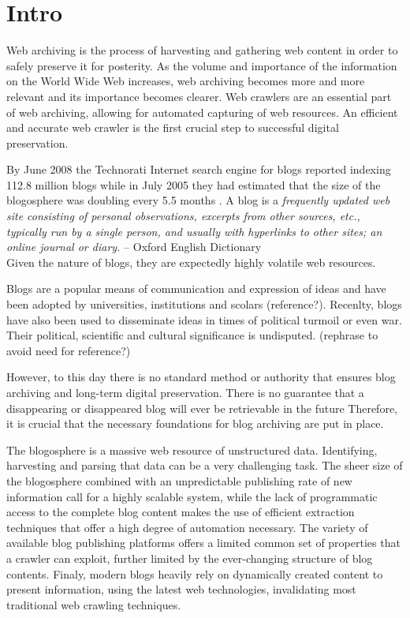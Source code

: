\section{Intro}

Web archiving is the process of harvesting and gathering web content in order to safely preserve it for posterity.
As the volume and importance of the information on the World Wide Web increases, web archiving becomes more and more relevant and its importance becomes clearer.
Web crawlers are an essential part of web archiving, allowing for automated capturing of web resources.
An efficient and accurate web crawler is the first crucial step to successful digital preservation.

By June 2008 the Technorati Internet search engine for blogs reported indexing 112.8 million blogs \cite{technoratidata2008} while in July 2005 they had estimated that the size of the blogosphere was doubling every 5.5 months \cite{bloggrowth2005}.
A blog is a \emph{frequently updated web site consisting of personal observations, excerpts from other sources, etc., typically run by a single person, and usually with hyperlinks to other sites; an online journal or diary.} -- Oxford English Dictionary\\
Given the nature of blogs, they are expectedly highly volatile web resources.

Blogs are a popular means of communication and expression of ideas and have been adopted by universities, institutions and scolars (reference?).
Recenlty, blogs have also been used to disseminate ideas in times of political turmoil or even war\cite{nahedeltantawy2012}.
Their political, scientific and cultural significance is undisputed. (rephrase to avoid need for reference?)

However, to this day there is no standard method or authority that ensures blog archiving and long-term digital preservation.
There is no guarantee that a disappearing or disappeared blog will ever be retrievable in the future \cite{anderson2012}
Therefore, it is crucial that the necessary foundations for blog archiving are put in place.

The blogosphere is a massive web resource of unstructured data.
Identifying, harvesting and parsing that data can be a very challenging task.
The sheer size of the blogosphere combined with an unpredictable publishing rate of new information call for a highly scalable system, while the lack of programmatic access to the complete blog content makes the use of efficient extraction techniques that offer a high degree of automation necessary.
The variety of available blog publishing platforms offers a limited common set of properties that a crawler can exploit, further limited by the ever-changing structure of blog contents.
Finaly, modern blogs heavily rely on dynamically created content to present information, using the latest web technologies, invalidating most traditional web crawling techniques.

